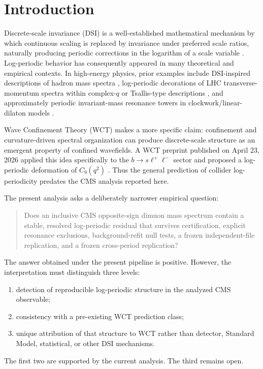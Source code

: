 \documentclass[11pt]{article}
\begin{document}
\section{Introduction}

Discrete-scale invariance (DSI) is a well-established mathematical mechanism
by which continuous scaling is replaced by invariance under preferred scale
ratios, naturally producing periodic corrections in the logarithm of a scale
variable \cite{Sornette1998}.  Log-periodic behavior has consequently appeared
in many theoretical and empirical contexts.  In high-energy physics, prior
examples include DSI-inspired descriptions of hadron mass spectra
\cite{Tatischeff2011}, log-periodic decorations of LHC transverse-momentum
spectra within complex-\(q\) or Tsallis-type descriptions
\cite{Wilk2014,Wilk2015}, and approximately periodic invariant-mass resonance
towers in clockwork/linear-dilaton models \cite{Giudice2018}.

Wave Confinement Theory (WCT) makes a more specific claim: confinement and
curvature-driven spectral organization can produce discrete-scale structure
as an emergent property of confined wavefields.  A WCT preprint published on
April 23, 2026 applied this idea specifically to the
\(b\to s\ell^+\ell^-\) sector and proposed a log-periodic deformation of
\(C_9(q^2)\) \cite{ReyesC9}.  Thus the general prediction of collider
log-periodicity predates the CMS analysis reported here.

The present analysis asks a deliberately narrower empirical question:
\begin{quote}
Does an inclusive CMS opposite-sign dimuon mass spectrum contain a stable,
resolved log-periodic residual that survives certification, explicit resonance
exclusions, background-refit null tests, a frozen independent-file
replication, and a frozen cross-period replication?
\end{quote}

The answer obtained under the present pipeline is positive.  However, the
interpretation must distinguish three levels:
\begin{enumerate}
    \item detection of reproducible log-periodic structure in the analyzed CMS
          observable;
    \item consistency with a pre-existing WCT prediction class;
    \item unique attribution of that structure to WCT rather than detector,
          Standard Model, statistical, or other DSI mechanisms.
\end{enumerate}
The first two are supported by the current analysis.  The third remains open.
\end{document}
